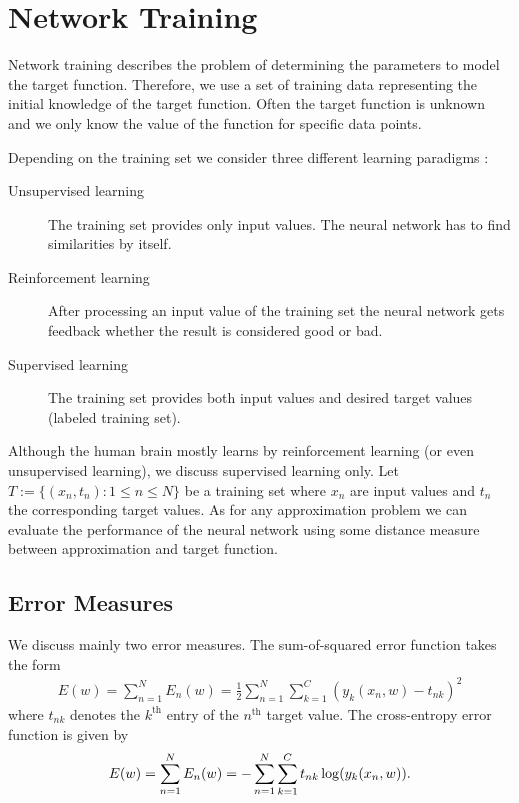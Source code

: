 \section{Network Training}
\label{sec:network-training}

Network training describes the problem of determining the parameters to model the target function. Therefore, we use a set of training data representing the initial knowledge of the target function. Often the target function is unknown and we only know the value of the function for specific data points.

Depending on the training set we consider three different learning paradigms \cite[p.~85-88]{Haykin:2005}:
\begin{description}
\item[Unsupervised learning] The training set provides only input values. The neural network has to find similarities by itself.
\item[Reinforcement learning] After processing an input value of the training set the neural network gets feedback whether the result is considered good or bad.
\item[Supervised learning] The training set provides both input values and desired target values (labeled training set).
\end{description}

Although the human brain mostly learns by reinforcement learning (or even unsupervised learning), we discuss supervised learning only. Let $T := \{(x_n, t_n) : 1 \leq n \leq N\}$ be a training set where $x_n$ are input values and $t_n$ the corresponding target values. As for any approximation problem we can evaluate the performance of the neural network using some distance measure between approximation and target function.

\subsection{Error Measures}
\label{subsec:error-measures}

We discuss mainly two error measures. The sum-of-squared error function takes the form
\begin{align}
E (w) = \sum _{n = 1} ^N E_n (w) = \frac{1}{2} \sum _{n = 1} ^N \sum _{k = 1} ^C (y_k(x_n,w) - t_{nk})^2
\end{align}
where $t_{nk}$ denotes the $k^{\text{th}}$ entry of the $n^{\text{th}}$ target value. The cross-entropy error function is given by
\begin{align}
E(w) = \sum _{n = 1} ^N E_n (w) = - \sum _{n = 1} ^N \sum _{k = 1} ^C t_{nk} \log(y_k(x_n, w))\onedot
\end{align}

